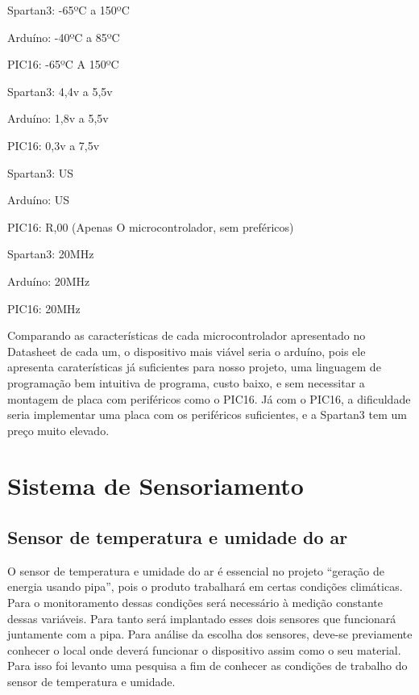 \begin{description}
	\item[Temperatura de funcionamento:] \hfill
		\item Spartan3: -65ºC a 150ºC
		\item Arduíno: -40ºC a 85ºC
		\item PIC16: -65ºC A 150ºC

	\item[Tensão de funcionamento:] \hfill
		\item Spartan3: 4,4v a 5,5v
		\item Arduíno: 1,8v a 5,5v
		\item PIC16: 0,3v a 7,5v

	\item[Preço:] \hfill
		\item Spartan3: US
		\item Arduíno: US
		\item PIC16: R,00 (Apenas O microcontrolador, sem preféricos)
 
	\item[Frequência de funcionamento:] \hfill
		\item Spartan3: 20MHz
		\item Arduíno:  20MHz
		\item PIC16: 20MHz
\end{description}
 
Comparando as características de cada microcontrolador apresentado no Datasheet de cada um, o dispositivo mais viável seria o arduíno, pois ele apresenta caraterísticas já suficientes para nosso projeto, uma linguagem de programação bem intuitiva de programa, custo baixo, e sem necessitar a montagem de placa com periféricos como o PIC16. Já com o PIC16, a dificuldade seria implementar uma placa com os periféricos suficientes, e a Spartan3 tem um preço muito elevado.

\chapter{Sistema de Sensoriamento}
	
\section{Sensor de temperatura e umidade do ar}

O sensor de temperatura e umidade do ar é essencial no projeto “geração de energia usando pipa”, pois o produto trabalhará em certas condições climáticas. Para o monitoramento dessas condições será necessário à medição constante dessas variáveis. Para tanto será implantado esses dois sensores que funcionará juntamente com a pipa.
Para análise da escolha dos sensores, deve-se previamente conhecer o local onde deverá funcionar o dispositivo assim como o seu material. Para isso foi levanto uma pesquisa a fim de conhecer as condições de trabalho do sensor de temperatura e umidade.

